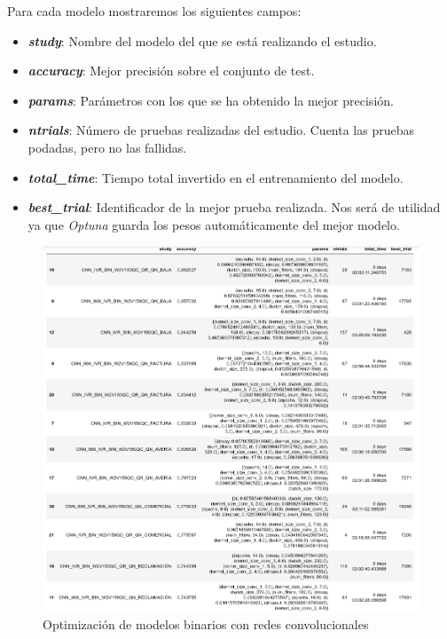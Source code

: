 Para cada modelo mostraremos los siguientes campos: 

\begin{itemize}
\item \textbf{\textit{study}}: Nombre del modelo del que se está realizando el estudio. 
\item \textbf{\textit{accuracy}}: Mejor precisión sobre el conjunto de test.
 \item \textbf{\textit{params}}: Parámetros con los que se ha obtenido la mejor precisión. 
  \item \textbf{\textit{ntrials}}: Número de pruebas realizadas del estudio. Cuenta las pruebas podadas, pero no las fallidas. 
    \item \textbf{\textit{total\_time}}: Tiempo total invertido en el entrenamiento del modelo.
    \item \textbf{\textit{best\_trial}}: Identificador de la mejor prueba realizada. Nos será de utilidad ya que \textit{Optuna} guarda los pesos automáticamente del mejor modelo.
\end{itemize}


\begin{figure}[!ht]
	\centering
	\includegraphics[width=1\textwidth]{images/super/opt_cnn}
	\caption{Optimización de modelos binarios con redes convolucionales}
	\label{fig:opt_cnn}
\end{figure}

